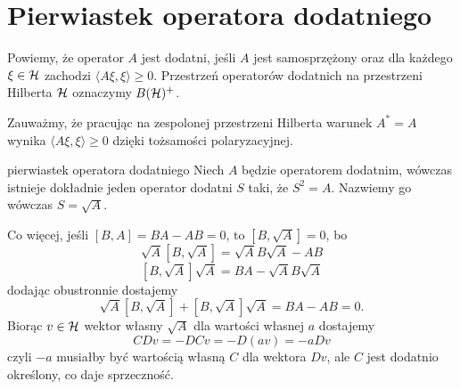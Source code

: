 \section{Pierwiastek operatora dodatniego}

Powiemy, że operator $A$ jest dodatni, jeśli $A$ jest samosprzężony oraz dla każdego $\xi\in\operatorname{\mathcal{H}}$ zachodzi $\langle A\xi,\xi\rangle\geq0$. Przestrzeń operatorów dodatnich na przestrzeni Hilberta $\operatorname{\mathcal{H}}$ oznaczymy $B(\operatorname{\mathcal{H}})^+$.

Zauważmy, że pracując na zespolonej przestrzeni Hilberta warunek $A^*=A$ wynika $\langle A\xi, \xi\rangle\geq 0$ dzięki tożsamości polaryzacyjnej.

\begin{theorem}{pierwiastek operatora dodatniego}{}
  Niech $A$ będzie operatorem dodatnim, wówczas istnieje dokładnie jeden operator dodatni $S$ taki, że $S^2=A$. Nazwiemy go wówczas $S=\sqrt{A}$.
\end{theorem}

Co więcej, jeśli $[B, A]=BA-AB=0$, to $[B,\sqrt{A}]=0$, bo
$$\sqrt{A}[B,\sqrt{A}]=\sqrt{A}B\sqrt{A}-AB$$
$$[B, \sqrt{A}]\sqrt{A}=BA-\sqrt{A}B\sqrt{A}$$
dodając obustronnie dostajemy
$$\sqrt{A}[B,\sqrt{A}]+[B,\sqrt{A}]\sqrt{A}=BA-AB=0.$$
Biorąc $v\in\operatorname{\mathcal{H}}$ wektor własny $\sqrt{A}$ dla wartości własnej $a$ dostajemy
$$CDv=-DCv=-D(av)=-aDv$$
czyli $-a$ musiałby być wartością własną $C$ dla wektora $Dv$, ale $C$ jest dodatnio określony, co daje sprzeczność.
  
